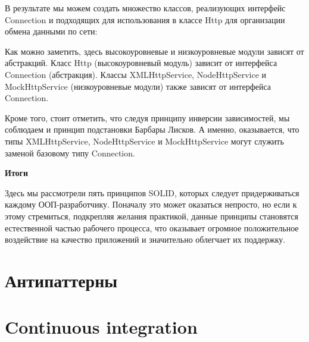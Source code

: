 \documentclass[a4paper]{article}
\begin{document}
В результате мы можем создать множество классов, реализующих интерфейс Connection и подходящих для использования в классе Http для организации обмена
данными по сети:

\begin{figure}[h]
\end{figure}

Как можно заметить, здесь высокоуровневые и низкоуровневые модули зависят от абстракций. Класс Http (высокоуровневый модуль) зависит от интерфейса Connection (абстракция). Классы XMLHttpService, NodeHttpService и MockHttpService (низкоуровневые модули) также зависят от интерфейса Connection.

Кроме того, стоит отметить, что следуя принципу инверсии зависимостей, мы соблюдаем и принцип подстановки Барбары Лисков. А именно, оказывается, что типы XMLHttpService, NodeHttpService и MockHttpService могут служить заменой базовому типу Connection.

\textbf{Итоги}

Здесь мы рассмотрели пять принципов SOLID, которых следует придерживаться каждому ООП-разработчику. Поначалу это может оказаться непросто, но если к этому стремиться, подкрепляя желания практикой, данные принципы становятся естественной частью рабочего процесса, что оказывает огромное положительное воздействие на качество приложений и значительно облегчает их поддержку.

\section{Антипаттерны}

\section{Continuous integration}
\end{document}
